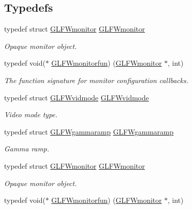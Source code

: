 \subsection*{Typedefs}
\begin{DoxyCompactItemize}
\item 
typedef struct \hyperlink{group__monitor_ga8d9efd1cde9426692c73fe40437d0ae3}{G\+L\+F\+Wmonitor} \hyperlink{group__monitor_ga8d9efd1cde9426692c73fe40437d0ae3}{G\+L\+F\+Wmonitor}
\begin{DoxyCompactList}\small\item\em Opaque monitor object. \end{DoxyCompactList}\item 
typedef void($\ast$ \hyperlink{group__monitor_ga8a7ee579a66720f24d656526f3e44c63}{G\+L\+F\+Wmonitorfun}) (\hyperlink{group__monitor_ga8d9efd1cde9426692c73fe40437d0ae3}{G\+L\+F\+Wmonitor} $\ast$, int)
\begin{DoxyCompactList}\small\item\em The function signature for monitor configuration callbacks. \end{DoxyCompactList}\item 
typedef struct \hyperlink{structGLFWvidmode}{G\+L\+F\+Wvidmode} \hyperlink{group__monitor_gae48aadf4ea0967e6605c8f58fa5daccb}{G\+L\+F\+Wvidmode}
\begin{DoxyCompactList}\small\item\em Video mode type. \end{DoxyCompactList}\item 
typedef struct \hyperlink{structGLFWgammaramp}{G\+L\+F\+Wgammaramp} \hyperlink{group__monitor_gaec0bd37af673be8813592849f13e02f0}{G\+L\+F\+Wgammaramp}
\begin{DoxyCompactList}\small\item\em Gamma ramp. \end{DoxyCompactList}\item 
typedef struct \hyperlink{group__monitor_ga8d9efd1cde9426692c73fe40437d0ae3}{G\+L\+F\+Wmonitor} \hyperlink{group__monitor_ga8d9efd1cde9426692c73fe40437d0ae3}{G\+L\+F\+Wmonitor}
\begin{DoxyCompactList}\small\item\em Opaque monitor object. \end{DoxyCompactList}\item 
typedef void($\ast$ \hyperlink{group__monitor_ga8a7ee579a66720f24d656526f3e44c63}{G\+L\+F\+Wmonitorfun}) (\hyperlink{group__monitor_ga8d9efd1cde9426692c73fe40437d0ae3}{G\+L\+F\+Wmonitor} $\ast$, int)

\end{DoxyCompactItemize}
